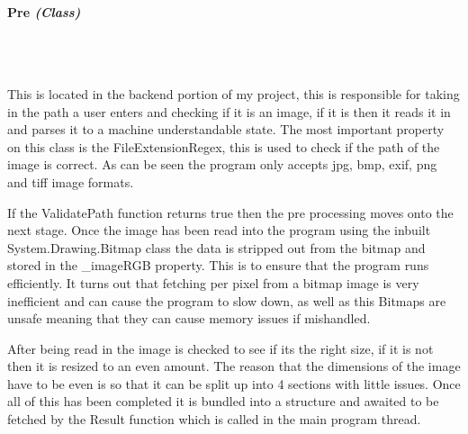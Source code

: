 \begin{FlushLeft}
    \pagebreak
\paragraph{Pre \textit{(Class)}} \mbox{} \\

    \begin{figure}[H]
        \centering
    \end{figure}\\

    This is located in the backend portion of my project, this is responsible for taking in the path a user enters and checking if it is an image, if it is then it reads it in and parses it to a machine understandable state. The most important property on this class is the FileExtensionRegex, this is used to check if the path of the image is correct. As can be seen the program only accepts jpg, bmp, exif, png and tiff image formats. \\ \bk
    
    If the ValidatePath function returns true then the pre processing moves onto the next stage. Once the image has been read into the program using the inbuilt System.Drawing.Bitmap class the data is stripped out from the bitmap and stored in the _imageRGB property. This is to ensure that the program runs efficiently. It turns out that fetching per pixel from a bitmap image is very inefficient and can cause the program to slow down, as well as this Bitmaps are unsafe meaning that they can cause memory issues if mishandled. \\ \bk

    After being read in the image is checked to see if its the right size, if it is not then it is resized to an even amount. The reason that the dimensions of the image have to be even is so that it can be split up into 4 sections with little issues. Once all of this has been completed it is bundled into a structure and awaited to be fetched by the Result function which is called in the main program thread.\\
    \bk


\end{FlushLeft}
